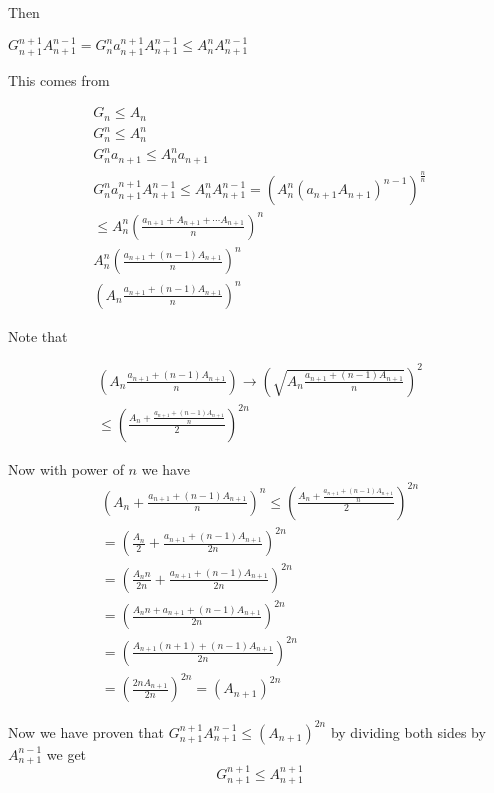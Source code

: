 Then

\(G_{n + 1}^{n + 1}  A_{n + 1}^{n - 1} = G_{n}^{n} a_{n + 1}^{n + 1} A_{n + 1}^{n - 1} \leq A_{n}^{n} A_{n + 1}^{n - 1}\)

This comes from

\begin{align*}
		G_n \leq A_n\\
		G_n^{n} \leq A_n^{n}\\
		G_n^{n} a_{n+1} \leq A_n^{n} a_{n+1}\\
		G_{n}^{n} a_{n + 1}^{n + 1} A_{n + 1}^{n - 1} \leq A_{n}^{n} A_{n + 1}^{n - 1} = {\left(A_{n}^{n} {\left( a_{n + 1} A_{n +1}\right)}^{n -1} \right)}^{\frac{n}{n}}\\
		\leq A_{n}^{n} {\left( \frac{a_{n + 1} + A_{n + 1} + \cdots A_{n + 1}}{n} \right)}^{n}\\
		A_{n}^{n} {\left( \frac{a_{n + 1} + (n - 1)A_{n + 1}}{n} \right)}^{n}\\
		{\left( A_{n} \frac{a_{n + 1} + (n - 1)A_{n + 1}}{n} \right)}^{n}
\end{align*}

Note that

\begin{align*}
	\left( A_{n} \frac{a_{n + 1} + (n - 1)A_{n + 1}}{n} \right) \rightarrow  {\left( \sqrt{A_{n} \frac{a_{n + 1} + (n - 1)A_{n + 1}}{n}} \right)}^{2}\\
	\leq {\left( \frac{ A_n + \frac{a_{n + 1} + (n - 1)A_{n + 1}}{n}}{2} \right)}^{2n}
\end{align*}

Now with power of \(n\) we have
\begin{align*}
		{\left( A_{n} + \frac{a_{n + 1} + (n - 1)A_{n + 1}}{n} \right)}^{n} \leq {\left( \frac{A_{n} + \frac{a_{n + 1} + (n - 1)A_{n + 1}}{n}}{2} \right)}^{2n}\\
		= {\left( \frac{A_n}{2} + \frac{a_{n + 1} + (n - 1)A_{n + 1}}{2n}\right)}^{2n}\\
		= {\left( \frac{A_n n}{2n} + \frac{a_{n + 1} + (n - 1)A_{n + 1}}{2n}\right)}^{2n}\\
		= {\left( \frac{A_n n  + a_{n + 1} + (n - 1)A_{n + 1}}{2n}\right)}^{2n}\\
		= {\left( \frac{A_{n + 1}(n + 1) + (n - 1)A_{n + 1}}{2n}\right)}^{2n}\\
		= {\left( \frac{2n A_{n + 1}}{2n}\right)}^{2n} = {\left(A_{n + 1}\right)}^{2n}
\end{align*}

Now we have proven that \(G_{n + 1}^{n + 1} A_{n + 1}^{n - 1}\leq {\left(A_{n + 1}\right)}^{2n}\)
 by dividing both sides by \( A_{n + 1}^{n - 1} \) we get
	\[
		G_{n + 1}^{n + 1}\leq A_{n + 1}^{n + 1}
	\]
\QED

